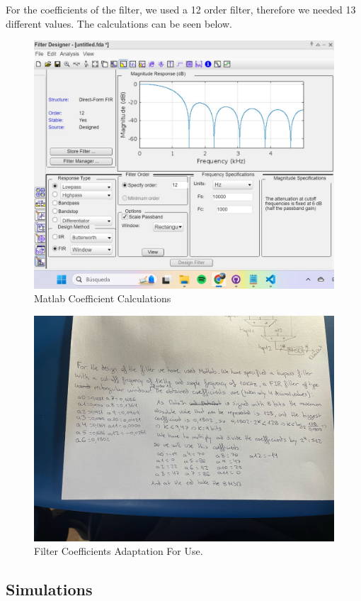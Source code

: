 \documentclass[a4paper, 12pt]{article}
\begin{document}
For the coefficients of the filter, we used a 12 order filter, therefore we needed 13 different values. The calculations can be seen below.

\begin{figure}[htbp]
\centering
\includegraphics[width=.9\linewidth]{./img/filter_coefficient_matlab.jpg}
\caption{Matlab Coefficient Calculations}
\end{figure}

\begin{figure}[htbp]
\centering
\includegraphics[width=.9\linewidth]{./img/filter_coefficient_calculations.jpg}
\caption{Filter Coefficients Adaptation For Use.}
\end{figure}
\subsection{Simulations}
\label{sec:org349e5e9}
\end{document}
